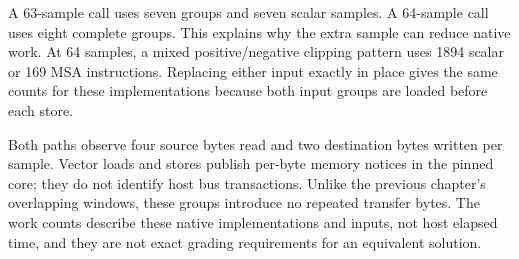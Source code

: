 A 63-sample call uses seven groups and seven scalar samples. A 64-sample call uses
eight complete groups. This explains why the extra sample can reduce native work.
At 64 samples, a mixed positive/negative clipping pattern uses 1894 scalar or 169
MSA instructions. Replacing either input exactly in place gives the same counts
for these implementations because both input groups are loaded before each store.

Both paths observe four source bytes read and two destination bytes written per
sample. Vector loads and stores publish per-byte memory notices in the pinned core;
they do not identify host bus transactions. Unlike the previous chapter's overlapping
windows, these groups introduce no repeated transfer bytes. The work counts describe
these native implementations and inputs, not host elapsed time, and they are not
exact grading requirements for an equivalent solution.
